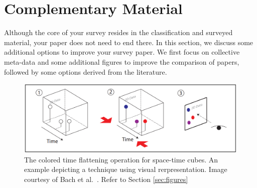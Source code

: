 \section{Complementary Material}
Although the core of your survey resides in the classification and surveyed material, your paper does not need to end there. In this section, we discuss some additional options to improve your survey paper. We first focus on collective meta-data and some additional figures to improve the comparison of papers, followed by some options derived from the literature. 



\begin{figure}
\centering
\includegraphics[width=0.7\linewidth]{pictures/sto.png}
\caption{The colored time flattening operation for space-time cubes. An example depicting a technique using visual rerpresentation. Image courtesy of Bach et al.\ \cite{bach2014review}. Refer to Section \ref{sec:figures}} \label{fig:sto}
\end{figure}

